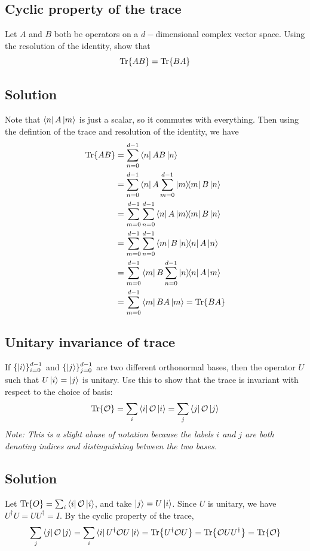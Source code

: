 \documentclass{article}
\begin{document}
{\subsection*{Cyclic property of the trace}
Let $A$ and $B$ both be operators on a $d-$dimensional complex vector space. Using the resolution of the identity, show that
$$
\Tr{AB} = \Tr{BA}
$$

\subsection*{Solution}
Note that $\bra{n}A\ket{m}$ is just a scalar, so it commutes with everything. Then using the defintion of the trace and resolution of the identity, we have
\begin{align}
\Tr{AB} &= \sum_{n=0}^{d-1}\bra{n}AB\ket{n} \\
&= \sum_{n=0}^{d-1}\bra{n}A\sum_{m=0}^{d-1}\ketbra{m}{m}B\ket{n} \\
&= \sum_{m=0}^{d-1}\sum_{n=0}^{d-1}\bra{n}A\ketbra{m}{m}B\ket{n} \\
&= \sum_{m=0}^{d-1}\sum_{n=0}^{d-1}\bra{m}B\ketbra{n}{n}A\ket{n} \\
&= \sum_{m=0}^{d-1}\bra{m}B\sum_{n=0}^{d-1}\ketbra{n}{n}A\ket{m} \\
&= \sum_{m=0}^{d-1}\bra{m}BA\ket{m} = \Tr{BA}
\end{align}

\subsection*{Unitary invariance of trace}
If $\{\ket{i}\}_{i = 0}^{d-1}$ and $\{ \ket{j}\}_{j=0}^{d-1}$ are two different orthonormal bases, then the operator $U$ such that $U\ket{i} = \ket{j}$ is unitary. Use this to show that the trace is invariant with respect to the choice of basis:
$$
\Tr\{\mathcal O\} = \sum_{i}\bra{i}\mathcal O \ket{i} = \sum_{j}\bra{j}\mathcal O \ket{j}
$$
\textit{Note: This is a slight abuse of notation because the labels $i$ and $j$ are both denoting indices and distinguishing between the two bases.} 

\subsection*{Solution}
Let $\Tr{O} = \sum_{i}\bra{i}\mathcal O\ket{i}$, and take $\ket{j} = U\ket{i}$. Since $U$ is unitary, we have $U^\dagger U = UU^\dagger = I$. By the cyclic property of the trace,
$$
\sum_{j}\bra{j}\mathcal O \ket{j} = \sum_{i}\bra{i}U^\dagger\mathcal O U\ket{i} = \Tr{U^\dagger \mathcal O U} = \Tr{\mathcal O U U^\dagger} = \Tr{\mathcal O}
$$

}
\end{document}
